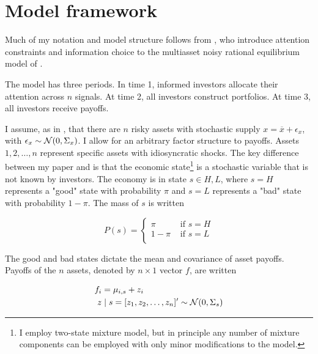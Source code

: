 \documentclass{article}
\begin{document}
\section{Model framework}\label{sec:model}

Much of my notation and model structure follows from \textcite{kacperczyk_rational_2016}, who introduce attention constraints and information choice to the multiasset noisy rational equilibrium model of \textcite{admati_noisy_1985}.

The model has three periods. In time 1, informed investors allocate their attention across $n$ signals. At time 2, all investors construct portfolios. At time 3, all investors receive payoffs.

I assume, as in \textcite{kacperczyk_rational_2016}, that there are $n$ risky assets with stochastic supply $x=\overline x + \epsilon_x$, with $\epsilon_x \sim \mathcal{N}(0, \Sigma_x)$. I allow for an arbitrary factor structure to payoffs. Assets $1,2,\dots,n$ represent specific assets with idiosyncratic shocks. The key difference between my paper and \textcite{kacperczyk_rational_2016} is that the economic state\footnote{I employ two-state mixture model, but in principle any number of mixture components can be employed with only minor modifications to the model.} is a stochastic variable that is not known by investors. The economy is in state $s \in {H, L}$, where $s=H$ represents a "good" state with probability $\pi$ and $s=L$ represents a "bad" state with probability $1-\pi$. The mass of $s$ is written

$$
P(s) = \begin{cases}
    \pi & \text{ if } s = H \\
    1-\pi & \text{ if } s = L \\
\end{cases}
$$

The good and bad states dictate the mean and covariance of asset payoffs. Payoffs of the $n$ assets, denoted by $n\times 1$ vector $f$, are written

\begin{align}
    f_i &= \mu_{i,s} + z_i\\
    z &\mid s = [z_1,z_2, \dots, z_n]' \sim \mathcal{N}(0, \Sigma_s)
\end{align}
\end{document}

